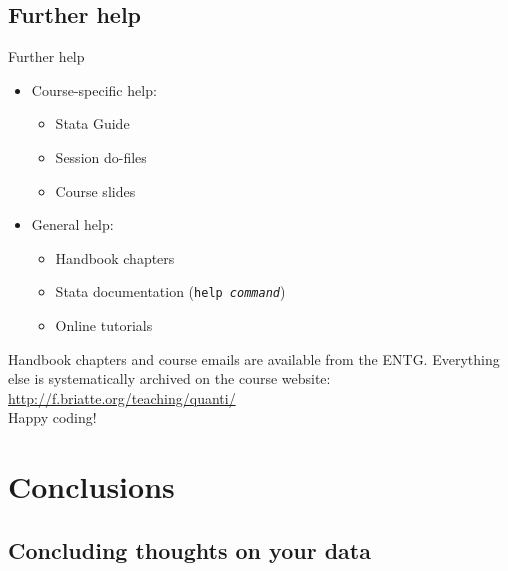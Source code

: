 \documentclass[t]{beamer}
\begin{document}
	\subsection{Further help}
	
	\begin{frame}[t]{Further help}

		\begin{itemize}

			\item Course-specific help:

			\begin{itemize}
				\item Stata Guide
				\item Session do-files
				\item Course slides
			\end{itemize}
	
			\item General help:
			
			\begin{itemize}
				\item Handbook chapters
				\item Stata documentation (\texttt{help \emph{command}})
				\item Online tutorials
			\end{itemize}

		\end{itemize}

		Handbook chapters and course emails are available from the ENTG. Everything else is systematically archived on the course website:\\[.5em]
		
		\url{http://f.briatte.org/teaching/quanti/}\\[.5em]
		
		Happy coding!
		
	\end{frame}
	
	\section{Conclusions}

	\subsection{Concluding thoughts on your data}
\end{document}
